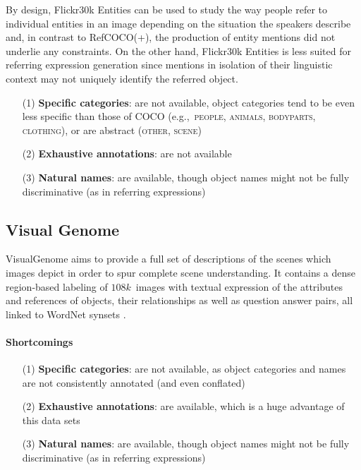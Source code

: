 \documentclass[runningheads]{llncs}
\newcommand{\vgenome}{VisualGenome\xspace}
\newcommand{\refcoco}{RefCOCO\xspace}
\newcommand{\flickr}{Flickr30k Entities\xspace}
\newcommand{\cat}[1]{\textsc{#1}}
\begin{document}
By design, \flickr can be used to study the way people refer to individual entities in an image depending on the situation the speakers describe and,  
in contrast to \refcoco(+), the production of entity mentions did not underlie any constraints. 
On the other hand, \flickr is less suited for referring expression generation since mentions in isolation of their linguistic context may not uniquely identify the referred object. 

\begin{itemize}
     		\item[(1)] \textbf{Specific categories}: are not available, object categories tend to be even less specific than those of COCO (e.g.,~\cat{people, animals, bodyparts, clothing}), or are abstract (\cat{other, scene})
		\item[(2)] \textbf{Exhaustive annotations}: are not available
		   \item[(3)] \textbf{Natural names}: are available, though object names might not be fully discriminative (as in referring expressions)

\end{itemize}


\subsection{Visual Genome}

\vgenome \cite{krishna2016visualgenome} aims to provide a full set of descriptions of the scenes which images depict in order to spur complete scene understanding. 
It contains a dense region-based labeling of $108k$~images with textual expression of the attributes and references of objects, their relationships as well as question answer pairs, all linked to WordNet synsets \cite[see below]{fellbaum1998wordnet}. 

\paragraph{Shortcomings}


\begin{itemize}
     		\item[(1)] \textbf{Specific categories}: are not available, as object categories and names are not consistently annotated (and even conflated)
				\item[(2)] \textbf{Exhaustive annotations}: are available, which is a huge advantage of this data sets
		   \item[(3)] \textbf{Natural names}: are available, though object names might not be fully discriminative (as in referring expressions)

\end{itemize}
\end{document}
